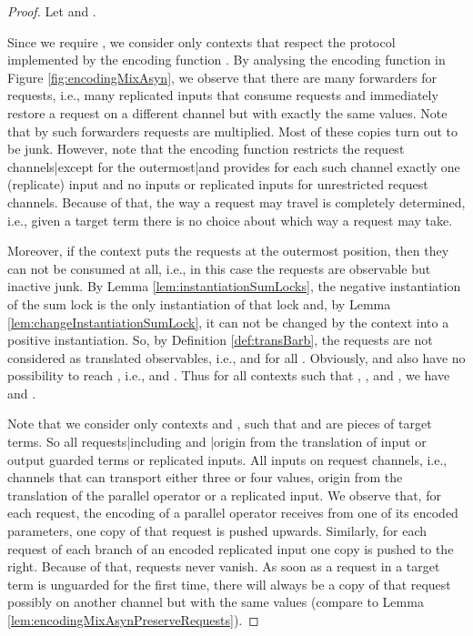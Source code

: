 \documentclass[]{llncs}
\begin{document}
\begin{proof}
	Let  and .
	
	Since we require , we consider only contexts that respect the protocol implemented by the encoding function . By analysing the encoding function in Figure \ref{fig:encodingMixAsyn}, we observe that there are many forwarders for requests, i.e., many replicated inputs that consume requests and immediately restore a request on a different channel but with exactly the same values. Note that by such forwarders requests are multiplied. Most of these copies turn out to be junk. However, note that the encoding function restricts the request channels|except for the outermost|and provides for each such channel exactly one (replicate) input and no inputs or replicated inputs for unrestricted request channels. Because of that, the way a request may travel is completely determined, i.e., given a target term there is no choice about which way a request may take.
	
	Moreover, if the context puts the requests at the outermost position, then they can not be consumed at all, i.e., in this case the requests are observable but inactive junk. By Lemma \ref{lem:instantiationSumLocks}, the negative instantiation of the sum lock  is the only instantiation of that lock and, by Lemma \ref{lem:changeInstantiationSumLock}, it can not be changed by the context into a positive instantiation. So, by Definition \ref{def:transBarb}, the requests are not considered as translated observables, i.e.,  and  for all . Obviously,  and  also have no possibility to reach , i.e.,  and . Thus for all contexts  such that , , and , we have  and .
	
	Note that we consider only contexts  and , such that  and  are pieces of target terms. So all requests|including  and |origin from the translation of input or output guarded terms or replicated inputs. All inputs on request channels, i.e., channels that can transport either three or four values, origin from the translation of the parallel operator or a replicated input. We observe that, for each request, the encoding of a parallel operator receives from one of its encoded parameters, one copy of that request is pushed upwards. Similarly, for each request of each branch of an encoded replicated input one copy is pushed to the right. Because of that, requests never vanish. As soon as a request in a target term is unguarded for the first time, there will always be a copy of that request possibly on another channel but with the same values (compare to Lemma \ref{lem:encodingMixAsynPreserveRequests}).
	

\end{proof}
\end{document}
